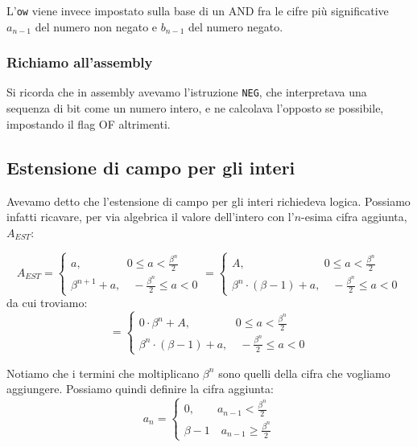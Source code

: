 \documentclass[a4paper,11pt]{article}
\begin{document}
L'\lstinline|ow| viene invece impostato sulla base di un AND fra le cifre più significative $a_{n-1}$ del numero non negato e $b_{n-1}$ del numero negato.

\subsubsection{Richiamo all'assembly}
Si ricorda che in assembly avevamo l'istruzione \lstinline|NEG|, che interpretava una sequenza di bit come un numero intero, e ne calcolava l'opposto se possibile, impostando il flag OF altrimenti.

\subsection{Estensione di campo per gli interi}
Avevamo detto che l'estensione di campo per gli interi richiedeva logica.
Possiamo infatti ricavare, per via algebrica il valore dell'intero con l'$n$-esima cifra aggiunta, $A_{EST}$:

$$
A_{EST} = 
	\begin{cases}
		a, \quad \quad \quad \quad 0 \leq a < \frac{\beta^n}{2} \\ 
		\beta^{n+1} + a, \quad -\frac{\beta^n}{2} \leq a < 0
	\end{cases}
	=
	\begin{cases}
		A, \quad \quad \quad \quad \quad \quad \quad 0 \leq a < \frac{\beta^n}{2} \\ 
		\beta^{n} \cdot (\beta - 1) + a, \quad -\frac{\beta^n}{2} \leq a < 0
	\end{cases}
$$
da cui troviamo:
$$
	=
	\begin{cases}
		0 \cdot \beta^n + A,  \quad \quad \quad \quad 0 \leq a < \frac{\beta^n}{2} \\ 
		\beta^{n} \cdot (\beta - 1) + a, \quad -\frac{\beta^n}{2} \leq a < 0
	\end{cases}
$$

Notiamo che i termini che moltiplicano $\beta^n$ sono quelli della cifra che vogliamo aggiungere.
Possiamo quindi definire la cifra aggiunta:
$$
a_n =
	\begin{cases}
		0, \quad \quad a_{n-1} < \frac{\beta^n}{2} \\ 
		\beta -1 \quad a_{n-1} \geq \frac{\beta^n}{2}
	\end{cases}
$$
\end{document}
